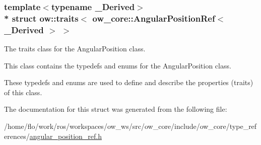 \subsubsection*{template$<$typename \+\_\+\+Derived$>$\\*
struct ow\+::traits$<$ ow\+\_\+core\+::\+Angular\+Position\+Ref$<$ \+\_\+\+Derived $>$ $>$}

The traits class for the Angular\+Position class. 

This class contains the typedefs and enums for the Angular\+Position class.

These typedefs and enums are used to define and describe the properties (traits) of this class. 

The documentation for this struct was generated from the following file\+:\begin{DoxyCompactItemize}
\item 
/home/flo/work/ros/workspaces/ow\+\_\+ws/src/ow\+\_\+core/include/ow\+\_\+core/type\+\_\+references/\hyperlink{angular__position__ref_8h}{angular\+\_\+position\+\_\+ref.\+h}\end{DoxyCompactItemize}
